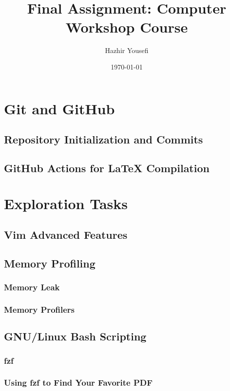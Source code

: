 \documentclass{article}
\title{Final Assignment: Computer Workshop Course}
\author{Hazhir Yousefi}
\date{\today}
\begin{document}
\maketitle

\tableofcontents

\section{Git and GitHub}
\subsection{Repository Initialization and Commits}


\subsection{GitHub Actions for LaTeX Compilation}


\section{Exploration Tasks}
\subsection{Vim Advanced Features}


\subsection{Memory Profiling}

\subsubsection{Memory Leak}

\subsubsection{Memory Profilers}

\subsection{GNU/Linux Bash Scripting}

\subsubsection{fzf}

\subsubsection{Using fzf to Find Your Favorite PDF}
\end{document}

